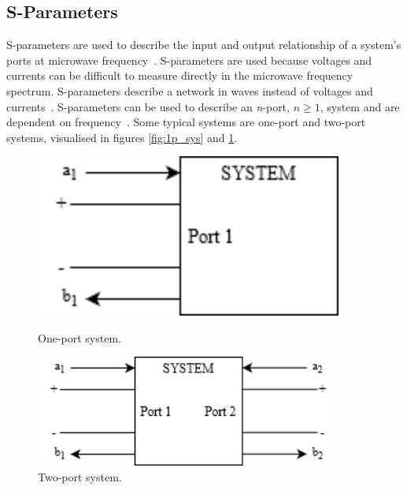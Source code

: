 \subsection{S-Parameters} \label{ss:s_params}
S-parameters are used to describe the input and output relationship of a system's ports at microwave frequency~\cite{s_params}. S-parameters are used because voltages and currents can be difficult to measure directly in the microwave frequency spectrum. S-parameters describe a network in waves instead of voltages and currents~\cite{ming_notes}. S-parameters can be used to describe an \textit{n}-port, $n\geq1$, system and are dependent on frequency~\cite{s_params}. Some typical systems are one-port and two-port systems, visualised in figures \ref{fig:1p_sys} and \ref{fig:2p_sys}.
\begin{figure}[H]
    \begin{minipage}{0.45\textwidth}
        \centering
        \includegraphics[width=0.9\textwidth]{figures/1p_system.png} %
        \caption{One-port system.} \label{fig:1p_sys}
    \end{minipage}\hfill
    \begin{minipage}{0.45\textwidth}
        \centering
        \includegraphics[width=0.9\textwidth]{figures/2p_system.png} %
        \caption{Two-port system.} \label{fig:2p_sys}
    \end{minipage}
\end{figure}

